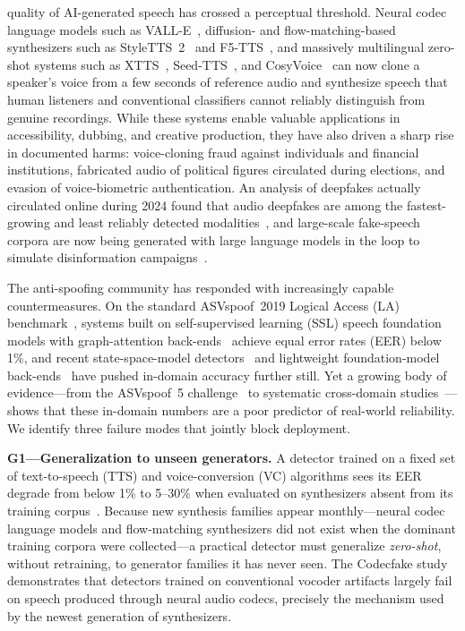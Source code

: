 
 quality of AI-generated speech has crossed a perceptual
threshold. Neural codec language models such as VALL-E~\cite{wang2023valle},
diffusion- and flow-matching-based synthesizers such as StyleTTS~2~\cite{li2023styletts2}
and F5-TTS~\cite{chen2024f5tts}, and massively multilingual zero-shot systems such as
XTTS~\cite{casanova2024xtts}, Seed-TTS~\cite{anastassiou2024seedtts}, and
CosyVoice~\cite{du2024cosyvoice} can now clone a speaker's voice from a few seconds of
reference audio and synthesize speech that human listeners and conventional classifiers
cannot reliably distinguish from genuine recordings. While these systems enable valuable
applications in accessibility, dubbing, and creative production, they have also driven a
sharp rise in documented harms: voice-cloning fraud against individuals and financial
institutions, fabricated audio of political figures circulated during elections, and
evasion of voice-biometric authentication. An analysis of deepfakes actually circulated
online during 2024 found that audio deepfakes are among the fastest-growing and least
reliably detected modalities~\cite{chandra2025deepfakeeval}, and large-scale fake-speech
corpora are now being generated with large language models in the loop to simulate
disinformation campaigns~\cite{luong2024llamapartialspoof}.

The anti-spoofing community has responded with increasingly capable countermeasures.
On the standard ASVspoof~2019 Logical Access (LA) benchmark~\cite{wang2020asvspoof2019},
systems built on self-supervised learning (SSL) speech foundation models with
graph-attention back-ends~\cite{tak2022automatic,jung2022aasist} achieve equal error
rates (EER) below 1\%, and recent state-space-model
detectors~\cite{xiao2025xlsrmamba,chen2024rawbmamba} and lightweight foundation-model
back-ends~\cite{liu2025nes2net} have pushed in-domain accuracy further still. Yet a
growing body of evidence---from the ASVspoof~5 challenge~\cite{wang2024asvspoof5,
wang2025asvspoof5journal} to systematic cross-domain
studies~\cite{muller2022inthewild,muller2024harder}---shows that these in-domain numbers
are a poor predictor of real-world reliability. We identify three failure modes that
jointly block deployment.

\textbf{G1---Generalization to unseen generators.} A detector trained on a fixed set of
text-to-speech (TTS) and voice-conversion (VC) algorithms sees its EER degrade from
below 1\% to 5--30\% when evaluated on synthesizers absent from its training
corpus~\cite{muller2022inthewild,muller2024harder}. Because new synthesis families
appear monthly---neural codec language models and flow-matching synthesizers did not
exist when the dominant training corpora were collected---a practical detector must
generalize \emph{zero-shot}, without retraining, to generator families it has never
seen. The Codecfake study~\cite{xie2025codecfake} demonstrates that detectors trained on
conventional vocoder artifacts largely fail on speech produced through neural audio
codecs, precisely the mechanism used by the newest generation of synthesizers.

